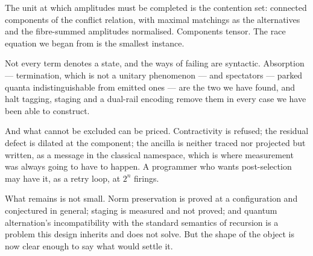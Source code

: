 \documentclass[11pt,a4paper]{article}
\theoremstyle{plain}
\theoremstyle{definition}
\theoremstyle{remark}
\begin{document}
The unit at which amplitudes must be completed is the contention set: connected
components of the conflict relation, with maximal matchings as the alternatives
and the fibre-summed amplitudes normalised. Components tensor. The race equation
we began from is the smallest instance.

Not every term denotes a state, and the ways of failing are syntactic.
Absorption --- termination, which is not a unitary phenomenon --- and spectators
--- parked quanta indistinguishable from emitted ones --- are the two we have
found, and halt tagging, staging and a dual-rail encoding remove them in every
case we have been able to construct.

And what cannot be excluded can be priced. Contractivity is refused; the
residual defect is dilated at the component; the ancilla is neither traced nor
projected but written, as a message in the classical namespace, which is where
measurement was always going to have to happen. A programmer who wants
post-selection may have it, as a retry loop, at $2^n$ firings.

What remains is not small. Norm preservation is proved at a configuration and
conjectured in general; staging is measured and not proved; and quantum
alternation's incompatibility with the standard semantics of recursion is a
problem this design inherits and does not solve. But the shape of the object is
now clear enough to say what would settle it.
\end{document}
